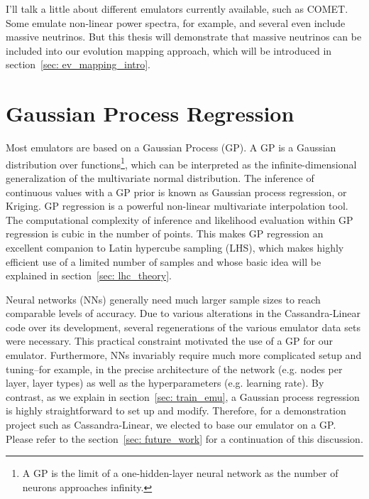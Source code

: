I'll talk a little about different emulators currently available, such as COMET. Some emulate non-linear power spectra, for example, and several even include massive neutrinos. But this thesis will demonstrate that massive neutrinos can be included into our evolution mapping approach, which will be introduced in section~\ref{sec: ev_mapping_intro}.


\section{Gaussian Process Regression}
\label{sec: gpr_intro}


Most emulators are based on a Gaussian Process (GP). A GP is a Gaussian
distribution over functions\footnote
{A GP is the limit of a one-hidden-layer neural network as the number of
neurons approaches infinity.}, which can be interpreted
as the infinite-dimensional generalization of the multivariate normal
distribution. The inference of continuous values with a GP prior
is known as Gaussian process regression, or Kriging. GP regression is a
powerful non-linear multivariate interpolation tool. The computational
complexity of inference and likelihood evaluation within GP regression is cubic
in the number of points. This makes GP regression an excellent companion to
Latin hypercube sampling (LHS), which makes highly efficient use of a limited 
number of samples and whose basic idea will be explained in section~\ref{sec:
lhc_theory}.

Neural networks (NNs) generally need much larger sample sizes to reach
comparable levels of
accuracy. Due to various alterations in the Cassandra-Linear code over its
development, several regenerations of the various emulator data sets were
necessary. This practical constraint motivated the use of a GP for our
emulator. Furthermore, NNs invariably require much more complicated setup and
tuning--for example, in the precise architecture of the network (e.g. nodes
per layer, layer types) as well as the hyperparameters (e.g. learning rate).
By contrast, as we explain in section~\ref{sec: train_emu}, a Gaussian
process regression is highly straightforward to set up and modify. Therefore,
for a demonstration project such as Cassandra-Linear, we elected to base our
emulator on a GP. Please refer to the section~\ref{sec: future_work} for a
continuation of this discussion.

